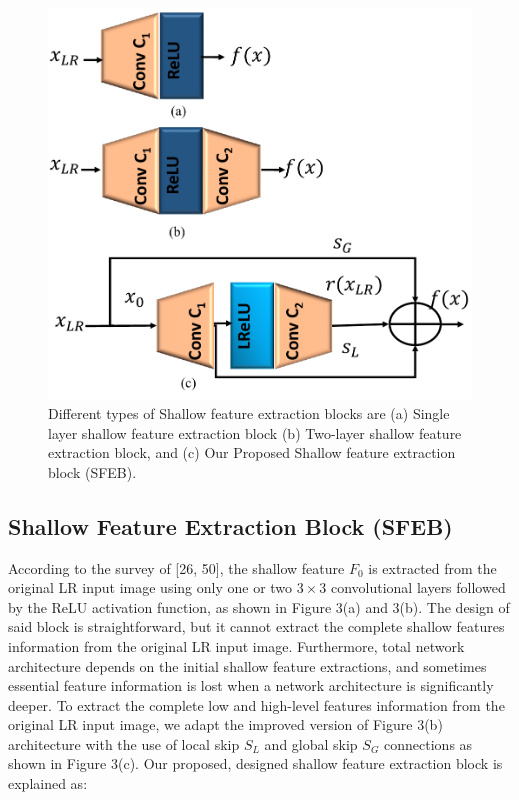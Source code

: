 \documentclass{ieeeaccess}
\begin{document}
\begin{figure}[ht]
  \includegraphics[width=\linewidth]{3FIGURE.pdf}
  \caption{Different types of Shallow feature extraction blocks are (a) Single layer shallow feature extraction block (b) Two-layer shallow feature extraction block, and (c) Our Proposed Shallow feature extraction block (SFEB).}
  \label{fig:7}
\end{figure}


\subsection{Shallow Feature Extraction Block (SFEB)}
According to the survey of [26, 50], the shallow feature $F_0$ is extracted from the original LR input image using only one or two $3\times3$ convolutional layers followed by the ReLU activation function, as shown in Figure 3(a) and 3(b). The design of said block is straightforward, but it cannot extract the complete shallow features information from the original LR input image. Furthermore, total network architecture depends on the initial shallow feature extractions, and sometimes essential feature information is lost when a network architecture is significantly deeper.   To extract the complete low and high-level features information from the original LR input image, we adapt the improved version of Figure 3(b) architecture with the use of local skip $S_L$ and global skip $S_G$ connections as shown in Figure 3(c). Our proposed, designed shallow feature extraction block is explained as:
\end{document}
